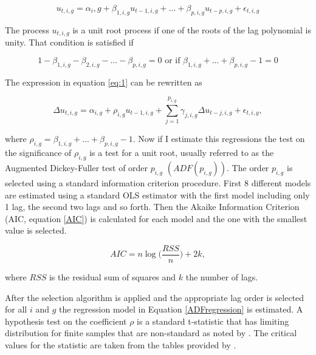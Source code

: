 \documentclass[12pt,a4paper,english]{article}
\begin{document}
\begin{equation}
 u_{t,i,g} = \alpha_i,g + \beta_{1,i,g}u_{t-1,i,g}+...+ \beta_{p,i,g}u_{t-p,i,g} + \epsilon_{t,i,g}
\end{equation}

%

The process $u_{t,i,g}$ is a unit root process if one of the roots of the lag polynomial is unity. That condition is satisfied if 

\begin{equation} \label{eq:1}
1-\beta_{1,i,g} - \beta_{2,i,g} - ... - \beta_{p,i,g} = 0  \text{ or if } \beta_{1,i,g} + ... + \beta_{p,i,g} -1 =0
\end{equation}

The expression in equation \ref{eq:1} can be rewritten as

\begin{equation}\label{ADFregression}
\Delta u_{t,i,g} = \alpha_{i,g} + \rho_{i,g} u_{t-1,i,g} + \sum_{j=1}^{p_{i,g}}\gamma_{j,i,g}\Delta u_{t-j,i,g} + \epsilon_{t,i,g} ,
\end{equation}

where $\rho_{i,g} = \beta_{1,i,g} + ... + \beta_{p,i,g} -1$. Now if I estimate this regressions the test on the significance of $\rho_{i,g}$ is a test for a unit root, usually referred to as the Augmented Dickey-Fuller test of order $p_{i,g}$ $(ADF(p_{i,g}))$. The order $p_{i,g}$ is selected using a standard information criterion procedure. First 8 different models are estimated using a standard OLS estimator with the first model including only 1 lag, the second two lags and so forth. Then the Akaike Information Criterion (AIC, equation \ref{AIC}) is calculated for each model and the one with the smallest value is selected.

\begin{equation} \label{AIC}
AIC = n \log\bigg(\dfrac{RSS}{n}\bigg) + 2 k , 
\end{equation}

where $RSS$ is the residual sum of squares and $k$ the number of lags.

After the selection algorithm is applied and the appropriate lag order is selected for all $i$ and $g$ the regression model in Equation \ref{ADFregression} is estimated. A hypothesis test on the coefficient $\rho$ is a standard t-statistic that has limiting distribution for finite samples that are non-standard as noted by \cite{dickey1981}. The critical values for the statistic are taken from the tables provided by \cite{dickey1981}.
\end{document}
